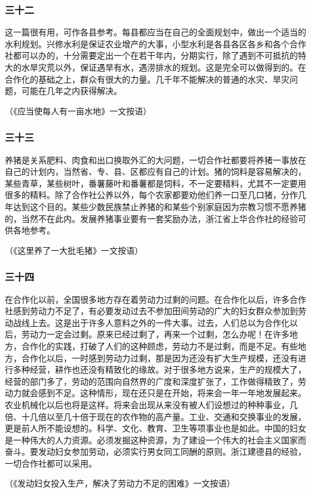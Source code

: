 \documentclass[cn,11pt,chinese]{elegantbook}
\def\myformat#1{\hfil\hfil #1}
\begin{document}
\subsubsection*{\myformat{三十二}}
这一篇很有用，可作各县参考。每县都应当在自己的全面规划中，做出一个适当的水利规划。兴修水利是保证农业增产的大事，小型水利是各县各区各乡和各个合作社都可以办的，十分需要定出一个在若干年内，分期实行，除了遇到不可抵抗的特大的水旱灾荒以外，保证遇旱有水，遇涝排水的规划。这是完全可以做得到的。在合作化的基础之上，群众有很大的力量。几千年不能解决的普通的水灾、旱灾问题，可能在几年之内获得解决。\\
\begin{flushright}（《应当使每人有一亩水地》一文按语）\end{flushright}
\subsubsection*{\myformat{三十三}}
养猪是关系肥料、肉食和出口换取外汇的大问题，一切合作社都要将养猪一事放在自己的计划内，当然省、专、县、区都应有自己的计划。猪的饲料是容易解决的，某些青草，某些树叶，番薯藤叶和番薯都是饲料，不一定要精料，尤其不一定要用很多的精料。除了合作社公养以外，每个农家都要劝他们养一口至几口猪，分作几年达到这个目的。某些少数民族禁止养猪的和某些个别家庭因为宗教习惯不愿养猪的，当然不在此内。发展养猪事业要有一套奖励办法，浙江省上华合作社的经验可供各地参考。\\
\begin{flushright}（《这里养了一大批毛猪》一文按语）\end{flushright}
\subsubsection*{\myformat{三十四}}
在合作化以前，全国很多地方存在着劳动力过剩的问题。在合作化以后，许多合作社感到劳动力不足了，有必要发动过去不参加田间劳动的广大的妇女群众参加到劳动战线上去。这是出于许多人意料之外的一件大事。过去，人们总以为合作化以后，劳动力一定会过剩。原来已经过剩了，再来一个过剩，怎么办呢！在许多地方，合作化的实践，打破了人们的这种顾虑，劳动力不是过剩，而是不足。有些地方，合作化以后，一时感到劳动力过剩，那是因为还没有扩大生产规模，还没有进行多种经营，耕作也还没有精致化的缘故。对于很多地方说来，生产的规模大了，经营的部门多了，劳动的范围向自然界的广度和深度扩张了，工作做得精致了，劳动力就会感到不足。这种情形，现在还只是在开始，将来会一年一年地发展起来。农业机械化以后也将是这样。将来会出现从来没有被人们设想过的种种事业，几倍、十几倍以至几十倍于现在的农作物的高产量。工业、交通和交换事业的发展，更是前人所不能设想的。科学、文化、教育、卫生等项事业也是如此。中国的妇女是一种伟大的人力资源。必须发掘这种资源，为了建设一个伟大的社会主义国家而奋斗。要发动妇女参加劳动，必须实行男女同工同酬的原则。浙江建德县的经验，一切合作社都可以采用。\\
\begin{flushright}（《发动妇女投入生产，解决了劳动力不足的困难》一文按语）\end{flushright}
\end{document}
